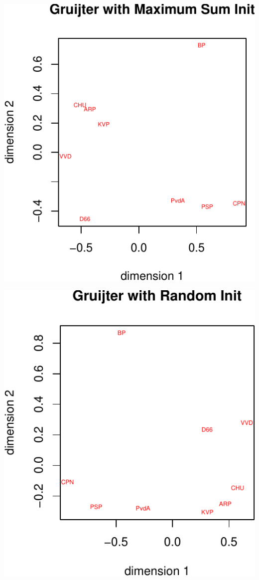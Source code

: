 \documentclass[
  12pt,
]{article}
\begin{document}
\begin{center}\includegraphics{smacofRO_files/figure-latex/gruiterconfs-2} \end{center}

\begin{center}\includegraphics{smacofRO_files/figure-latex/gruiterconfs-3} \end{center}
\end{document}
